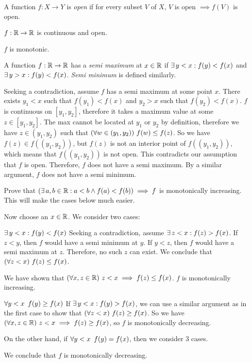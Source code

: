 \documentclass[11pt,letterpaper]{article}
\begin{document}
\begin{Problem}{4.15}
\begin{Definition} A function $f: X \rightarrow Y$ is \textit{open} if for every subset $V$ of $X$, $V$ is open $\implies f(V)$ is open. \end{Definition}
\begin{Hypothesis} $f:\mathbb{R}\rightarrow\mathbb{R}$ is continuous and open. \end{Hypothesis}
\begin{Claim} $f$ is monotonic. \end{Claim}
\begin{Proof}
\begin{Definition} A function $f: \mathbb{R} \rightarrow \mathbb{R}$ has a \textit{semi maximum} at $x\in\mathbb{R}$ if $\exists\, y<x :f(y)<f(x)$ and $\exists\, y>x :f(y)<f(x)$. \textit{Semi minimum} is defined similarly. \end{Definition}
Seeking a contradiction, assume $f$ has a semi maximum at some point $x$. There exists $y_1<x$ such that $f(y_1)<f(x)$ and $y_2>x$ such that $f(y_2)<f(x)$. $f$ is continuous on $[y_1,y_2]$, therefore it takes a maximum value at some $z \in [y_1,y_2]$. The max cannot be located at $y_1$ or $y_2$ by definition, therefore we have $z \in (y_1,y_2)$ such that $\left( \forall w\in(y_1,y_2) \right) \, f(w) \leq f(z)$. So we have $f(z) \in f((y_1,y_2))$, but $f(z)$ is not an interior point of $f((y_1,y_2))$, which means that $f((y_1,y_2))$ is not open. This contradicts our assumption that $f$ is open. Therefore, $f$ does not have a semi maximum. By a similar argument, $f$ does not have a semi minimum.

\begin{Todo} Prove that $\left( \exists\, a,b\in\mathbb{R} :a<b \land f(a)<f(b) \right) \implies f$ is monotonically increasing. This will make the cases below much easier. \end{Todo}

Now choose an $x\in\mathbb{R}$. We consider two cases:
\begin{Case}{1}{$\exists\, y<x :f(y)<f(x)$}
    Seeking a contradiction, assume $\exists\, z<x :f(z)>f(x)$. If $z<y$, then $f$ would have a semi minimum at $y$. If $y<z$, then $f$ would have a semi maximum at $z$. Therefore, no such $z$ can exist. We conclude that $\left( \forall z<x \right) \,f(z) \leq f(x)$.
    
    We have shown that $\left( \forall x,z\in\mathbb{R} \right) \,z<x \implies f(z) \leq f(x)$. $f$ is monotonically increasing. 
\end{Case}
\begin{Case}{2}{$\forall y<x \,\,\,f(y) \geq f(x)$}
    If $\exists\, y<x :f(y)>f(x)$, we can use a similar argument as in the first case to show that $\left( \forall z<x \right) \,f(z) \geq f(x)$. So we have $\left( \forall x,z\in\mathbb{R} \right) \,z<x \implies f(z) \geq f(x)$, so $f$ is monotonically decreasing.
    
    On the other hand, if $\forall y<x \,\,\,f(y)=f(x)$, then we consider 3 cases. 
    
    We conclude that $f$ is monotonically decreasing.
\end{Case}
\end{Proof}
\end{Problem}
\end{document}
